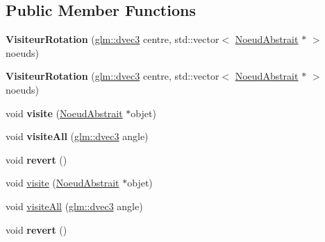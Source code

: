 \subsection*{Public Member Functions}
\begin{DoxyCompactItemize}
\item 
\hypertarget{class_visiteur_rotation_ad5d3f71aa945a9f387ae2c62ec1d5026}{{\bfseries Visiteur\-Rotation} (\hyperlink{group__core__types_ga7f3287f952e6ccb481231368091702ac}{glm\-::dvec3} centre, std\-::vector$<$ \hyperlink{class_noeud_abstrait}{Noeud\-Abstrait} $\ast$ $>$ noeuds)}\label{class_visiteur_rotation_ad5d3f71aa945a9f387ae2c62ec1d5026}

\item 
\hypertarget{group__inf2990_gad5d3f71aa945a9f387ae2c62ec1d5026}{{\bfseries Visiteur\-Rotation} (\hyperlink{group__core__types_ga7f3287f952e6ccb481231368091702ac}{glm\-::dvec3} centre, std\-::vector$<$ \hyperlink{class_noeud_abstrait}{Noeud\-Abstrait} $\ast$ $>$ noeuds)}\label{group__inf2990_gad5d3f71aa945a9f387ae2c62ec1d5026}

\item 
\hypertarget{group__inf2990_gab3678c4f238778882553b03a4eed5fdb}{void {\bfseries visite} (\hyperlink{class_noeud_abstrait}{Noeud\-Abstrait} $\ast$objet)}\label{group__inf2990_gab3678c4f238778882553b03a4eed5fdb}

\item 
\hypertarget{group__inf2990_gaea2e5737606a5ef316849a6357dd0833}{void {\bfseries visite\-All} (\hyperlink{group__core__types_ga7f3287f952e6ccb481231368091702ac}{glm\-::dvec3} angle)}\label{group__inf2990_gaea2e5737606a5ef316849a6357dd0833}

\item 
\hypertarget{group__inf2990_ga00654a07e13ff8cb214b7ca0328ccbae}{void {\bfseries revert} ()}\label{group__inf2990_ga00654a07e13ff8cb214b7ca0328ccbae}

\end{DoxyCompactItemize}
{\bf }\par
\begin{DoxyCompactItemize}
\item 
void \hyperlink{class_visiteur_rotation_gab3678c4f238778882553b03a4eed5fdb}{visite} (\hyperlink{class_noeud_abstrait}{Noeud\-Abstrait} $\ast$objet)
\item 
void \hyperlink{class_visiteur_rotation_gaea2e5737606a5ef316849a6357dd0833}{visite\-All} (\hyperlink{group__core__types_ga7f3287f952e6ccb481231368091702ac}{glm\-::dvec3} angle)
\item 
\hypertarget{class_visiteur_rotation_ga00654a07e13ff8cb214b7ca0328ccbae}{void {\bfseries revert} ()}\label{class_visiteur_rotation_ga00654a07e13ff8cb214b7ca0328ccbae}

\end{DoxyCompactItemize}


